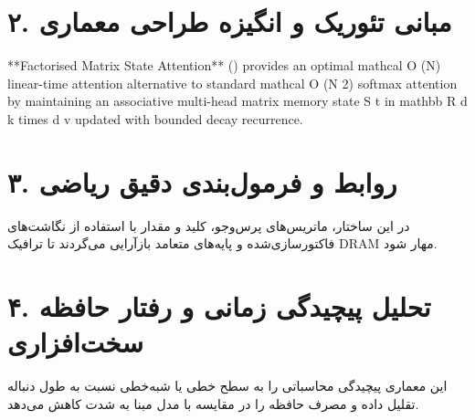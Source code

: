 \documentclass[12pt,a4paper]{article}
\begin{document}
\section*{۲. مبانی تئوریک و انگیزه طراحی معماری}
**Factorised Matrix State Attention** () provides an optimal mathcal O (N) linear-time attention alternative to standard mathcal O (N 2) softmax attention by maintaining an associative multi-head matrix memory state S t in mathbb R d k times d v updated with bounded decay recurrence.

\section*{۳. روابط و فرمول‌بندی دقیق ریاضی}
در این ساختار، ماتریس‌های پرس‌وجو، کلید و مقدار با استفاده از نگاشت‌های فاکتورسازی‌شده و پایه‌های متعامد بازآرایی می‌گردند تا ترافیک DRAM مهار شود.

\section*{۴. تحلیل پیچیدگی زمانی و رفتار حافظه سخت‌افزاری}
این معماری پیچیدگی محاسباتی را به سطح خطی یا شبه‌خطی نسبت به طول دنباله تقلیل داده و مصرف حافظه را در مقایسه با مدل مبنا به شدت کاهش می‌دهد.
\end{document}
